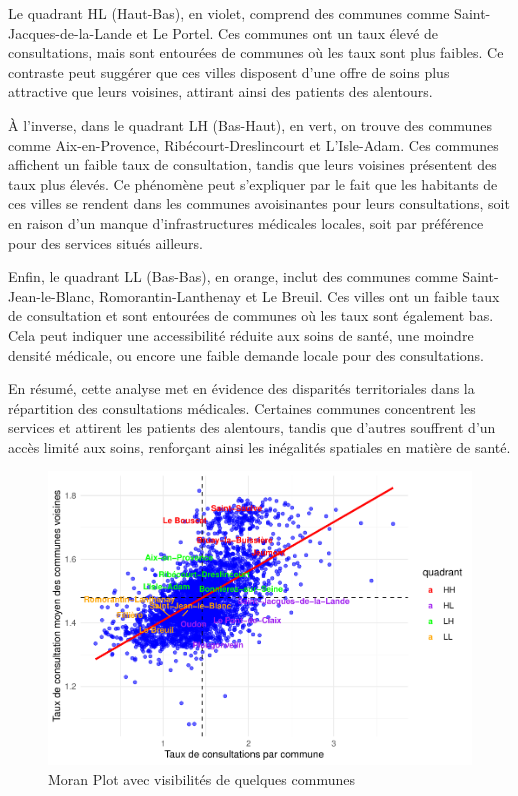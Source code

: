 \documentclass[
]{article}
\begin{document}
Le quadrant HL (Haut-Bas), en violet, comprend des communes comme
Saint-Jacques-de-la-Lande et Le Portel. Ces communes ont un taux élevé
de consultations, mais sont entourées de communes où les taux sont plus
faibles. Ce contraste peut suggérer que ces villes disposent d'une offre
de soins plus attractive que leurs voisines, attirant ainsi des patients
des alentours.

À l'inverse, dans le quadrant LH (Bas-Haut), en vert, on trouve des
communes comme Aix-en-Provence, Ribécourt-Dreslincourt et L'Isle-Adam.
Ces communes affichent un faible taux de consultation, tandis que leurs
voisines présentent des taux plus élevés. Ce phénomène peut s'expliquer
par le fait que les habitants de ces villes se rendent dans les communes
avoisinantes pour leurs consultations, soit en raison d'un manque
d'infrastructures médicales locales, soit par préférence pour des
services situés ailleurs.

Enfin, le quadrant LL (Bas-Bas), en orange, inclut des communes comme
Saint-Jean-le-Blanc, Romorantin-Lanthenay et Le Breuil. Ces villes ont
un faible taux de consultation et sont entourées de communes où les taux
sont également bas. Cela peut indiquer une accessibilité réduite aux
soins de santé, une moindre densité médicale, ou encore une faible
demande locale pour des consultations.

En résumé, cette analyse met en évidence des disparités territoriales
dans la répartition des consultations médicales. Certaines communes
concentrent les services et attirent les patients des alentours, tandis
que d'autres souffrent d'un accès limité aux soins, renforçant ainsi les
inégalités spatiales en matière de santé.

\begin{figure}

{\centering \includegraphics{4_Analyse_Descriptive_files/figure-latex/unnamed-chunk-21-1} 

}

\caption{Moran Plot avec visibilités de quelques communes}\label{fig:unnamed-chunk-21}
\end{figure}
\end{document}
